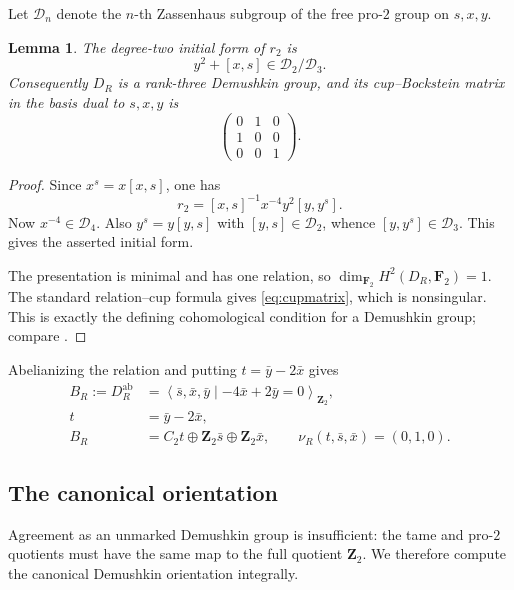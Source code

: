 \documentclass[11pt]{article}
\numberwithin{equation}{section}
\newtheorem{lemma}[theorem]{Lemma}
\theoremstyle{definition}
\theoremstyle{remark}
\newcommand{\Z}{\mathbf Z}
\newcommand{\F}{\mathbf F}
\newcommand{\ab}{\mathrm{ab}}
\newcommand{\DR}{D_R}
\newcommand{\nuR}{\nu_R}
\newcommand{\Zassenhaus}[1]{\mathcal D_{#1}}
\newcommand{\angles}[1]{\left\langle #1\right\rangle}
\begin{document}
Let \(\Zassenhaus{n}\) denote the \(n\)-th Zassenhaus subgroup of the free
pro-\(2\) group on \(s,x,y\).

\begin{lemma}\label{lem:initial}
The degree-two initial form of \(r_2\) is
\[
  y^2+[x,s]\in \Zassenhaus{2}/\Zassenhaus{3}.
\]
Consequently \(\DR\) is a rank-three Demushkin group, and its cup--Bockstein
matrix in the basis dual to \(s,x,y\) is
\begin{equation}\label{eq:cupmatrix}
  \begin{pmatrix}
    0&1&0\\
    1&0&0\\
    0&0&1
  \end{pmatrix}.
\end{equation}
\end{lemma}

\begin{proof}
Since \(x^s=x[x,s]\), one has
\[
  r_2=[x,s]^{-1}x^{-4}y^2[y,y^s].
\]
Now \(x^{-4}\in\Zassenhaus{4}\).  Also \(y^s=y[y,s]\) with
\([y,s]\in\Zassenhaus{2}\), whence
\([y,y^s]\in\Zassenhaus{3}\).  This gives the asserted initial form.

The presentation is minimal and has one relation, so
\(\dim_{\F_2}H^2(\DR,\F_2)=1\).  The standard relation--cup formula gives
\cref{eq:cupmatrix}, which is nonsingular.  This is exactly the defining
cohomological condition for a Demushkin group; compare
\cite[\S1]{Labute}.
\end{proof}

Abelianizing the relation and putting \(t=\bar y-2\bar x\) gives
\begin{align}
  B_R:=\DR^\ab
    &=\angles{\bar s,\bar x,\bar y\mid
       -4\bar x+2\bar y=0}_{\Z_2},\label{eq:BR}\\
  t&=\bar y-2\bar x,\label{eq:tR}\\
  B_R&=C_2t\oplus\Z_2\bar s\oplus\Z_2\bar x,\qquad
  \nuR(t,\bar s,\bar x)=(0,1,0).\label{eq:BRsplit}
\end{align}

\subsection{The canonical orientation}

Agreement as an unmarked Demushkin group is insufficient: the tame and
pro-\(2\) quotients must have the same map to the full quotient \(\Z_2\).
We therefore compute the canonical Demushkin orientation integrally.
\end{document}
